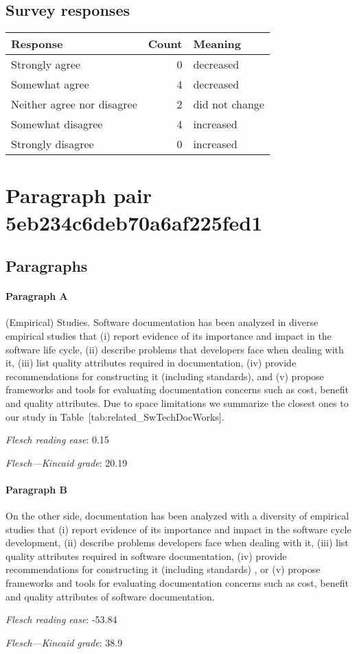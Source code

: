 \subsection{Survey responses}
\begin{tabular}{lrl}
\toprule
          \textbf{Response} &  \textbf{Count} & \textbf{Meaning} \\
\midrule
             Strongly agree &               0 &        decreased \\
             Somewhat agree &               4 &        decreased \\
 Neither agree nor disagree &               2 &   did not change \\
          Somewhat disagree &               4 &        increased \\
          Strongly disagree &               0 &        increased \\
\bottomrule
\end{tabular}

\section{Paragraph pair 5eb234c6deb70a6af225fed1}
\subsection{Paragraphs}
\paragraph{Paragraph A}
(Empirical) Studies. Software documentation has been analyzed in diverse empirical studies that (i) report evidence of its importance and impact in the software life cycle, (ii) describe problems that developers face when dealing with it, (iii) list quality attributes required in documentation, (iv) provide recommendations for constructing it (including standards), and (v) propose frameworks and tools for evaluating documentation concerns such as cost, benefit and quality attributes. Due to space limitations we summarize the closest ones to our study in Table [tab:related\_SwTechDocWorks].\par\medskip
\emph{Flesch reading ease}: 0.15\par
\emph{Flesch---Kincaid grade}: 20.19

\paragraph{Paragraph B}
On the other side, documentation has been analyzed with a diversity of empirical studies that (i) report evidence of its importance and impact in the software cycle development, (ii) describe problems developers face when dealing with it, (iii) list quality attributes required in software documentation, (iv) provide recommendations for constructing it (including standards) , or (v) propose frameworks and tools for evaluating documentation concerns such as cost, benefit and quality attributes of software documentation.\par\medskip
\emph{Flesch reading ease}: -53.84\par
\emph{Flesch---Kincaid grade}: 38.9

